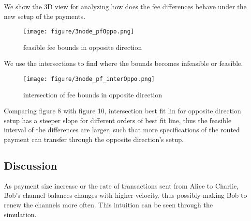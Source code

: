 \documentclass[twocolumn,10pt]{report}
\begin{document}
We show the 3D view for analyzing how does the fee differences behave under the new setup of the payments.  

\begin{figure}[t]
    \begin{center}
    \setlength{\unitlength}{0.012500in}%
    \texttt{[image: figure/3node\_pfOppo.png]}
    \end{center}
    \caption{feasible fee bounds in opposite direction}
    \label{figure_3Node11} 
    \end{figure}

We use the intersections to find where the bounds becomes infeasible or feasible. 


\begin{figure}[t]
    \begin{center}
    \setlength{\unitlength}{0.012500in}%
    \texttt{[image: figure/3node\_pf\_interOppo.png]}
    \end{center}
    \caption{intersection of fee bounds in opposite direction}
    \label{figure_3Node12} 
    \end{figure}

Comparing figure 8 with figure 10, intersection best fit lin for opposite direction setup has a steeper slope for different orders of best fit line, thus the feasible interval of the differences are larger, such that more specifications of the routed payment can transfer through the opposite direction's setup. 

\subsection{Discussion}
As payment size increase or the rate of transactions sent from Alice to Charlie, Bob's channel balances changes with higher velocity, thus possibly making Bob to renew the channels more often. This intuition can be seen through the simulation. 
\end{document}
